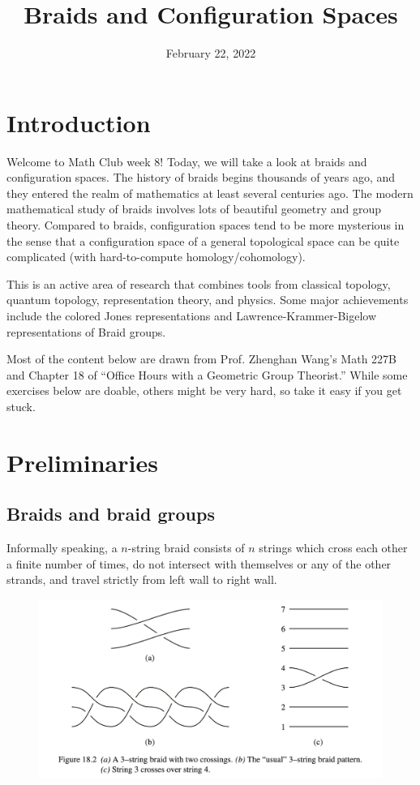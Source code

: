 \documentclass{article}
\title{Braids and Configuration Spaces}
\author{}
\date{February 22, 2022}
\begin{document}
\section{Introduction}

Welcome to Math Club week 8! Today, we will take a look at braids and configuration spaces. The history of braids begins thousands of years ago, and they entered the realm of mathematics at least several centuries ago. The modern mathematical study of braids involves lots of beautiful geometry and group theory. Compared to braids, configuration spaces tend to be more mysterious in the sense that a configuration space of a general topological space can be quite complicated (with hard-to-compute homology/cohomology). 

This is an active area of research that combines tools from classical topology, quantum topology, representation theory, and physics. Some major achievements include the colored Jones representations and Lawrence-Krammer-Bigelow representations of Braid groups. 

Most of the content below are drawn from Prof. Zhenghan Wang's Math 227B and Chapter 18 of ``Office Hours with a Geometric Group Theorist.'' While some exercises below are doable, others might be very hard, so take it easy if you get stuck.   
\section{Preliminaries}  

\subsection{Braids and braid groups} 

\begin{definition}
Informally speaking, a $n$-string braid consists of $n$ strings which cross each other a finite number of times, do not intersect with themselves or any of the other strands, and travel strictly from left wall to right wall. 
\end{definition}

\begin{figure}[hbt!]
\label{fig:aa}
\small
\centering
\includegraphics[scale = 0.5]{Pics/2.png}
\end{figure}
\leavevmode
\end{document}
